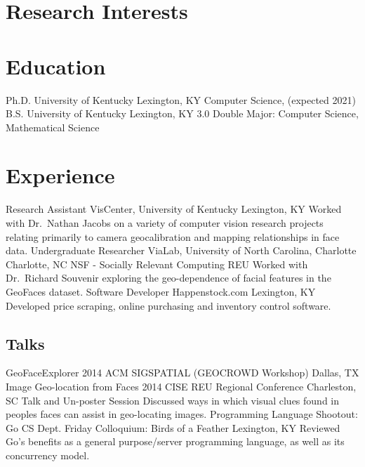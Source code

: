 \documentclass[10pt]{moderncv}
\begin{document}
\makecvtitle

\section{Research Interests}

\section{Education}
  {Ph.D.}
  {University of Kentucky}
  {Lexington, KY}
  {}
  {Computer Science, (expected 2021)}
  {B.S.}
  {University of Kentucky}
  {Lexington, KY}
  {3.0}
  {Double Major: Computer Science, Mathematical Science}

\section{Experience}
  {Research Assistant}
  {VisCenter, University of Kentucky}
  {Lexington, KY}
  {}
  {Worked with Dr.~Nathan Jacobs on a variety of computer vision
   research projects relating primarily to camera geocalibration and mapping
   relationships in face data.}
  {Undergraduate Researcher}
  {ViaLab, University of North Carolina, Charlotte}
  {Charlotte, NC}
  {NSF - Socially Relevant Computing REU}
  {Worked with Dr.~Richard Souvenir exploring the geo-dependence of
   facial features in the GeoFaces dataset.}
  {Software Developer}
  {Happenstock.com}
  {Lexington, KY}
  {}
  {Developed price scraping, online purchasing and inventory control
   software.}

\nocite{*}
\printbibliography[title={Publications}]

\subsection{Talks}
  {GeoFaceExplorer}
  {2014 ACM SIGSPATIAL (GEOCROWD Workshop)}
  {Dallas, TX}
  {}
  {}
  {Image Geo-location from Faces}
  {2014 CISE REU Regional Conference}
  {Charleston, SC}
  {Talk and Un-poster Session}
  {Discussed ways in which visual clues found in peoples faces can
   assist in geo-locating images.}
  {Programming Language Shootout: Go}
  {CS Dept. Friday Colloquium: Birds of a Feather}
  {Lexington, KY}
  {}
  {Reviewed Go's benefits as a general purpose/server programming
   language, as well as its concurrency model.}
\end{document}
